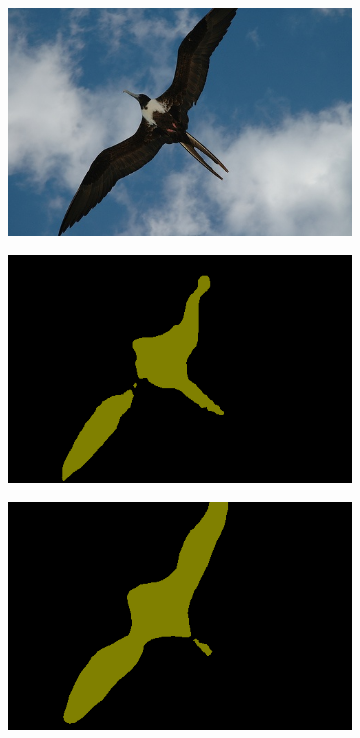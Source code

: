 \documentclass{article} %
\begin{document}
\begin{figure}[t]
  \begin{subfigure}[b]{0.19\linewidth}
    \includegraphics[width=\textwidth]{figs/ab/img/2007_002094}
  \end{subfigure}
  \begin{subfigure}[b]{0.19\linewidth}
    \includegraphics[width=\textwidth]{figs/ab/fcn/2007_002094}
  \end{subfigure}
  \begin{subfigure}[b]{0.19\linewidth}
    \includegraphics[width=\textwidth]{figs/ab/deeplab/2007_002094}

\end{subfigure}
\end{figure}
\end{document}
